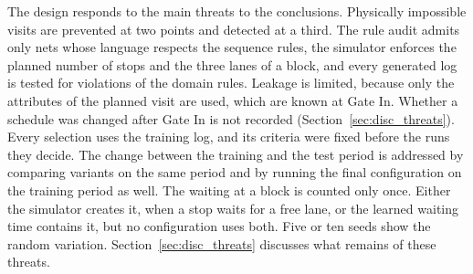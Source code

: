 The design responds to the main threats to the conclusions. Physically impossible
visits are prevented at two points and detected at a third. The rule audit admits
only nets whose language respects the sequence rules, the simulator enforces the
planned number of stops and the three lanes of a block, and every generated log is
tested for violations of the domain rules. Leakage is limited, because only the
attributes of the planned visit are used, which are known at Gate In. Whether a
schedule was changed after Gate In is not recorded
(Section~\ref{sec:disc_threats}). Every selection uses the training log, and its
criteria were fixed before the runs they decide. The change between the training and the test period is
addressed by comparing variants on the same period and by running the final
configuration on the training period as well. The waiting at a block is counted
only once. Either the simulator creates it, when a stop waits for a free lane, or
the learned waiting time contains it, but no configuration uses both. Five or ten
seeds show the random variation. Section~\ref{sec:disc_threats} discusses what
remains of these threats.

